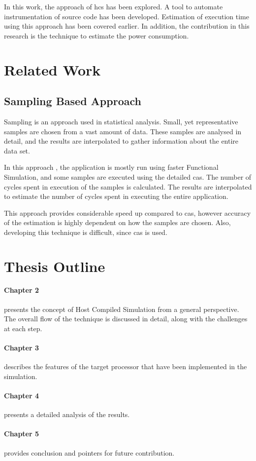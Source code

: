 In this work, the approach of \gls{hcs} has been explored. A tool to automate instrumentation of source code has been developed. Estimation of execution time using this approach has been covered earlier. In addition, the contribution in this research is the technique to estimate the power consumption.

\section{Related Work}

\subsection{Sampling Based Approach}
Sampling is an approach used in statistical analysis. Small, yet representative samples are chosen from a vast amount of data. These samples are analysed in detail, and the results are interpolated to gather information about the entire data set.

In this approach \cite{Wunderlich:2003,Ardestani:2013}, the application is mostly run using faster Functional Simulation, and some samples are executed using the detailed \gls{cas}. The number of cycles spent in execution of the samples is calculated. The results are interpolated to estimate the number of cycles spent in executing the entire application.

This approach provides considerable speed up compared to \gls{cas}, however accuracy of the estimation is highly dependent on how the samples are chosen. Also, developing this technique is difficult, since \gls{cas} is used.

\section{Thesis Outline}
\paragraph{Chapter 2} presents the concept of Host Compiled Simulation from a general perspective. The overall flow of the technique is discussed in detail, along with the challenges at each step.

\vspace*{-15pt}
\paragraph{Chapter 3} describes the features of the target processor that have been implemented in the simulation.

\vspace*{-15pt}
\paragraph{Chapter 4} presents a detailed analysis of the results.

\vspace*{-15pt}
\paragraph{Chapter 5} provides conclusion and pointers for future contribution.